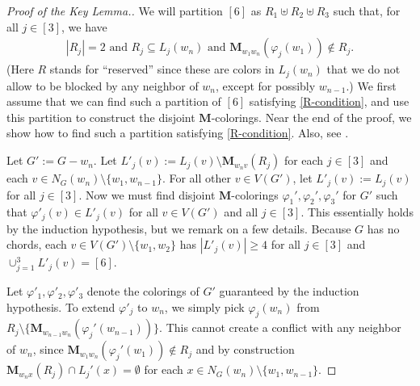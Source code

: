 \documentclass[11pt]{article}
\theoremstyle{definition}
\newcommand\vph{\varphi}
\renewcommand\ge{\geqslant}
\newcommand\MM{\textbf{M}}
\begin{document}
\begin{proof}[Proof of the Key Lemma.]
	We will partition $[6]$ as $R_1\uplus R_2\uplus R_3$ such that, 
	for all $j\in [3]$, we have 
	\begin{align}
		\mbox{$|R_j|=2$ and $R_j\subseteq L_j(w_n)$ and $\MM_{w_1w_n}(\vph_j(w_1))\notin R_j$.}
		\label{R-condition}
	\end{align}
	(Here $R$ stands for ``reserved'' since these are colors in $L_j(w_n)$ that we do not allow to be 
	blocked by any neighbor of $w_n$, except for possibly $w_{n-1}$.)
	We first assume that we can find such a partition of $[6]$ satisfying \eqref{R-condition}, and 
	use this partition to construct the disjoint $\MM$-colorings.  Near the end of the proof, 
	we show how to find such a partition satisfying \eqref{R-condition}.
        Also, see .

	Let $G':=G-w_n$.  Let $L'_j(v):=L_j(v)\setminus \MM_{w_nv}(R_j)$ for each $j\in [3]$ and 
	each $v\in N_G(w_n) \setminus\{w_1,w_{n-1}\}$.  For all other $v\in V(G')$, let $L'_j(v):=L_j(v)$ 
	for all $j\in[3]$.  Now we must find disjoint $\MM$-colorings $\vph_1',\vph_2',\vph_3'$ for $G'$ 
	such that $\vph'_j(v)\in L'_j(v)$
	for all $v\in V(G')$ and all $j\in[3]$.  This essentially holds by the induction hypothesis, but
	we remark on a few details.  Because $G$ has no chords, each $v\in V(G')\setminus\{w_1,w_2\}$
	has $|L'_j(v)|\ge 4$ for all $j\in[3]$ and $\cup_{j=1}^3L'_j(v)=[6]$.  

	Let $\vph'_1,\vph'_2,\vph'_3$ denote the colorings of $G'$ guaranteed by the induction hypothesis.
	To extend $\vph'_j$ to $w_n$, we simply pick $\vph_j(w_n)$ from $R_j\setminus 
	\{\MM_{w_{n-1}w_n}(\vph_j'(w_{n-1}))\}$.
	This cannot create a conflict with any neighbor of $w_n$, since $\MM_{w_1w_n}(\vph_j'(w_1))\notin R_j$
	and by construction $\MM_{w_nx}(R_j)\cap L_j'(x) = \emptyset$ for each $x\in N_G(w_n)
	\setminus\{w_1,w_{n-1}\}$.


\end{proof}
\end{document}
